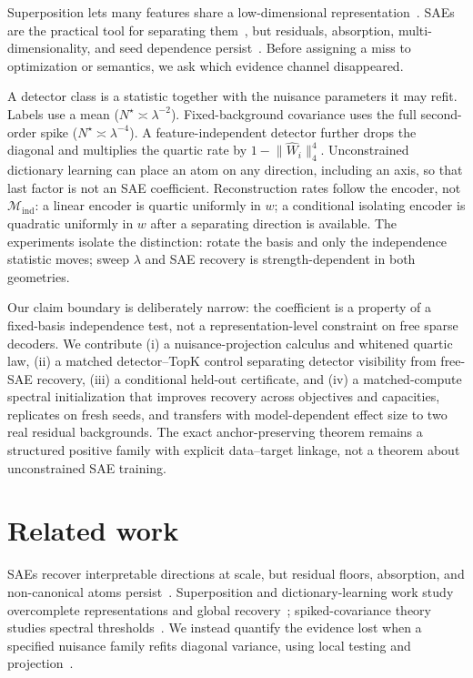 \documentclass{article}
\theoremstyle{plain}
\newcommand{\Wihat}{\widehat{W}_i}
\newcommand{\Mind}{\mathcal{M}_{\mathrm{ind}}}
\begin{document}
Superposition lets many features share a low-dimensional representation~\citep{elhage2022toy,scherlis2023polysemanticity}. SAEs are the practical tool for separating them~\citep{cunningham2024sae,bricken2023towards,gao2025scaling}, but residuals, absorption, multi-dimensionality, and seed dependence persist~\citep{engels2025dark,chanin2024absorption,engels2024nonlinear,leask2025canonical}. Before assigning a miss to optimization or semantics, we ask which evidence channel disappeared.

A detector class is a statistic together with the nuisance parameters it may refit. Labels use a mean ($N^\star\asymp\lambda^{-2}$). Fixed-background covariance uses the full second-order spike ($N^\star\asymp\lambda^{-4}$). A feature-independent detector further drops the diagonal and multiplies the quartic rate by $1-\lVert \Wihat\rVert_4^4$. Unconstrained dictionary learning can place an atom on any direction, including an axis, so that last factor is not an SAE coefficient. Reconstruction rates follow the encoder, not $\Mind$: a linear encoder is quartic uniformly in $w$; a conditional isolating encoder is quadratic uniformly in $w$ after a separating direction is available. The experiments isolate the distinction: rotate the basis and only the independence statistic moves; sweep $\lambda$ and SAE recovery is strength-dependent in both geometries.

Our claim boundary is deliberately narrow: the coefficient is a property of a fixed-basis independence test, not a representation-level constraint on free sparse decoders. We contribute (i) a nuisance-projection calculus and whitened quartic law, (ii) a matched detector--TopK control separating detector visibility from free-SAE recovery, (iii) a conditional held-out certificate, and (iv) a matched-compute spectral initialization that improves recovery across objectives and capacities, replicates on fresh seeds, and transfers with model-dependent effect size to two real residual backgrounds. The exact anchor-preserving theorem remains a structured positive family with explicit data--target linkage, not a theorem about unconstrained SAE training.

\section{Related work}
\label{sec:related}

SAEs recover interpretable directions at scale, but residual floors, absorption, and non-canonical atoms persist~\citep{cunningham2024sae,bricken2023towards,gao2025scaling,engels2025dark,chanin2024absorption,leask2025canonical}. Superposition and dictionary-learning work study overcomplete representations and global recovery~\citep{elhage2022toy,scherlis2023polysemanticity,spielman2012exact,arora2014new}; spiked-covariance theory studies spectral thresholds~\citep{johnstone2001distribution,baik2005phase,cai2013sparse,berthet2013complexity}. We instead quantify the evidence lost when a specified nuisance family refits diagonal variance, using local testing and projection~\citep{lecam1986asymptotic,amari2000methods,bickel1993efficient}.
\end{document}
